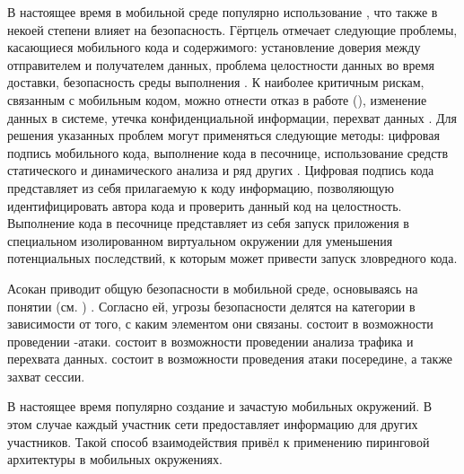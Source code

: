 %
В настоящее время в мобильной среде популярно использование , что также в некоей степени влияет на безопасность. 
%
Гёртцель отмечает следующие проблемы, касающиеся мобильного кода и содержимого: установление доверия между отправителем и получателем данных, проблема целостности данных во время доставки, безопасность среды выполнения .
%
К наиболее критичным рискам, связанным с мобильным кодом, можно отнести отказ в работе (), изменение данных в системе, утечка конфиденциальной информации, перехват данных .
%
Для решения указанных проблем могут применяться следующие методы: цифровая подпись мобильного кода, выполнение кода в песочнице, использование средств статического и динамического анализа и ряд других    . 
%
Цифровая подпись кода представляет из себя прилагаемую к коду информацию, позволяющую идентифицировать автора кода и проверить данный код на целостность. 
%
Выполнение кода в песочнице представляет из себя запуск приложения в специальном изолированном виртуальном окружении для уменьшения потенциальных последствий, к которым может привести запуск зловредного кода.

%
Асокан приводит общую  безопасности в мобильной среде, основываясь на понятии  (см. ) .
%
Согласно ей, угрозы безопасности делятся на категории в зависимости от того, с каким элементом  они связаны. 
%
 состоит в возможности проведении -атаки.
%
 состоит в возможности проведении анализа трафика и перехвата данных.
%
 состоит в возможности проведения атаки посередине, а также захват сессии.

%
В настоящее время популярно создание  и зачастую  мобильных окружений. 
%
В этом случае каждый участник сети предоставляет информацию для других участников. 
%
Такой способ взаимодействия привёл к применению пиринговой архитектуры в мобильных окружениях. 


